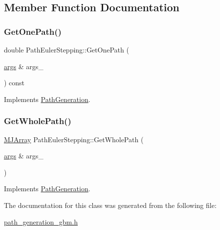 \subsection{Member Function Documentation}
\hypertarget{classPathEulerStepping_a7e38aa13e5807f3010892f7a4772fac6}{}\label{classPathEulerStepping_a7e38aa13e5807f3010892f7a4772fac6} 
\subsubsection{\texorpdfstring{Get\+One\+Path()}{GetOnePath()}}
{\footnotesize\ttfamily double Path\+Euler\+Stepping\+::\+Get\+One\+Path (\begin{DoxyParamCaption}\item[{\hyperlink{path__generation_8h_a75c13cde2074f502cc4348c70528572d}{args} \&}]{args\+\_\+ }\end{DoxyParamCaption}) const\hspace{0.3cm}{\ttfamily [virtual]}}



Implements \hyperlink{classPathGeneration_a9a64a37f4dd9b2b3ef84f3cb66aed843}{Path\+Generation}.

\hypertarget{classPathEulerStepping_afb4f8e7ce3c81671111486c0fa92a9d2}{}\label{classPathEulerStepping_afb4f8e7ce3c81671111486c0fa92a9d2} 
\subsubsection{\texorpdfstring{Get\+Whole\+Path()}{GetWholePath()}}
{\footnotesize\ttfamily \hyperlink{classMJArray}{M\+J\+Array} Path\+Euler\+Stepping\+::\+Get\+Whole\+Path (\begin{DoxyParamCaption}\item[{\hyperlink{path__generation_8h_a75c13cde2074f502cc4348c70528572d}{args} \&}]{args\+\_\+ }\end{DoxyParamCaption})\hspace{0.3cm}{\ttfamily [virtual]}}



Implements \hyperlink{classPathGeneration_ace7520fed7b6a7711f4d3684c974cb76}{Path\+Generation}.



The documentation for this class was generated from the following file\+:\begin{DoxyCompactItemize}
\item 
\hyperlink{path__generation__gbm_8h}{path\+\_\+generation\+\_\+gbm.\+h}\end{DoxyCompactItemize}
